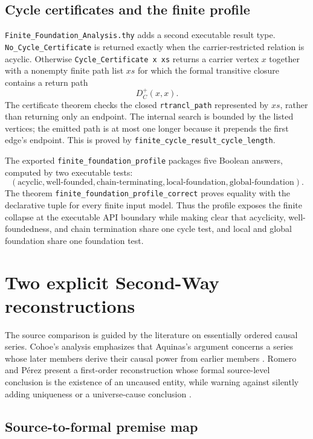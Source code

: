 \documentclass[11pt,a4paper]{article}
\begin{document}
\subsection{Cycle certificates and the finite profile}

\texttt{Finite\_Foundation\_Analysis.thy} adds a second executable result
type.  \texttt{No\_Cycle\_Certificate} is returned exactly when the
carrier-restricted relation is acyclic.  Otherwise
\texttt{Cycle\_Certificate x xs} returns a carrier vertex \(x\) together with a
nonempty finite path list \(xs\) for which the formal transitive closure
contains a return path
\[
  D_C^{+}(x,x).
\]
The certificate theorem checks the closed \texttt{rtrancl\_path} represented by
\(xs\), rather than returning only an endpoint.  The internal search is bounded
by the listed vertices; the emitted path is at most one longer because it
prepends the first edge's endpoint.  This is proved by
\texttt{finite\_cycle\_result\_cycle\_length}.

The exported \texttt{finite\_foundation\_profile} packages five Boolean
answers, computed by two executable tests:
\[
(\text{acyclic},\text{well-founded},\text{chain-terminating},
  \text{local-foundation},\text{global-foundation}).
\]
The theorem \texttt{finite\_foundation\_profile\_correct} proves equality with
the declarative tuple for every finite input model.  Thus the profile exposes
the finite collapse at the executable API boundary while making clear that
acyclicity, well-foundedness, and chain termination share one cycle test, and
local and global foundation share one foundation test.

\section{Two explicit Second-Way reconstructions}

The source comparison is guided by the literature on essentially ordered
causal series.  Cohoe's analysis emphasizes that Aquinas's argument concerns a
series whose later members derive their causal power from earlier members
\cite{Cohoe2013}.  Romero and Pérez present a first-order reconstruction whose
formal source-level conclusion is the existence of an uncaused entity, while
warning against silently adding uniqueness or a universe-cause conclusion
\cite{RomeroPerez2012}.

\subsection{Source-to-formal premise map}
\end{document}

